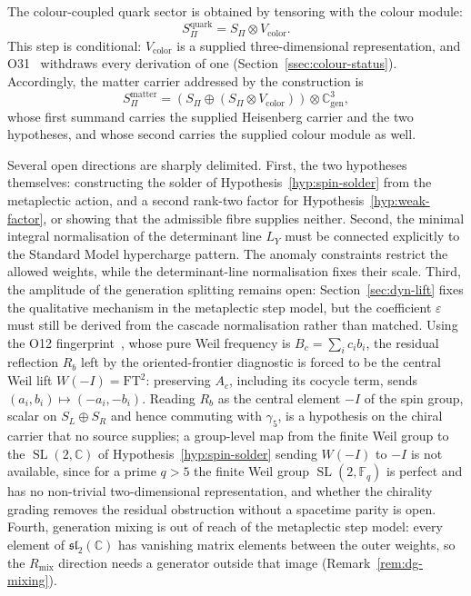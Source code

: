 \documentclass[11pt,a4paper]{article}
\theoremstyle{definition}
\theoremstyle{remark}
\newcommand{\SL}{\operatorname{SL}}
\begin{document}
  The colour-coupled quark sector is obtained by tensoring with the colour module:
  \[
    S_\Pi^{\mathrm{quark}}
    =
    S_\Pi \otimes V_{\mathrm{color}} .
  \]
  This step is conditional: $V_{\mathrm{color}}$ is a supplied three-dimensional representation,
  and O31~\cite{Beau2026a35} withdraws every derivation of one
  (Section~\ref{ssec:colour-status}).
  Accordingly, the matter carrier addressed by the construction is
  \[
    S_\Pi^{\mathrm{matter}}
    =
    \left(
      S_\Pi \oplus (S_\Pi\otimes V_{\mathrm{color}})
    \right)
    \otimes
    \mathbb{C}^3_{\mathrm{gen}},
  \]
  whose first summand carries the supplied Heisenberg carrier and the two hypotheses, and whose second
  carries the supplied colour module as well.

  Several open directions are sharply delimited.
  First, the two hypotheses themselves: constructing the solder of Hypothesis~\ref{hyp:spin-solder}
  from the metaplectic action, and a second rank-two factor for Hypothesis~\ref{hyp:weak-factor}, or
  showing that the admissible fibre supplies neither.
  Second, the minimal integral normalisation of the determinant line $L_Y$ must be
  connected explicitly to the Standard Model hypercharge pattern.
  The anomaly constraints restrict the allowed weights, while the determinant-line
  normalisation fixes their scale.
  Third, the amplitude of the generation splitting remains open: Section~\ref{sec:dyn-lift}
  fixes the qualitative mechanism in the metaplectic step model, but the coefficient $\varepsilon$ must
  still be derived from the cascade normalisation rather than matched.
  Using the O12 fingerprint~\cite{Beau2026a16}, whose pure Weil frequency is $B_c=\sum_i c_i b_i$, the
  residual reflection $R_b$ left by the oriented-frontier diagnostic is forced to be the central Weil
  lift $W(-I)=\mathrm{FT}^2$: preserving $A_c$, including its cocycle term, sends
  $(a_i,b_i)\mapsto(-a_i,-b_i)$.
  Reading $R_b$ as the central element $-I$ of the spin group, scalar on $S_L\oplus S_R$ and hence
  commuting with $\gamma_5$, is a hypothesis on the chiral carrier that no source supplies; a group-level map from
  the finite Weil group to the $\SL(2,\mathbb{C})$ of Hypothesis~\ref{hyp:spin-solder} sending $W(-I)$ to $-I$ is not
  available, since for a prime $q>5$ the finite Weil group $\SL(2,\mathbb{F}_q)$ is perfect and has no non-trivial
  two-dimensional representation, and whether the chirality grading removes the residual obstruction without a
  spacetime parity is open.
  Fourth, generation mixing is out of reach of the metaplectic step model: every element of
  $\mathfrak{sl}_2(\mathbb{C})$ has vanishing matrix elements between the outer weights, so the
  $R_{\mathrm{mix}}$ direction needs a generator outside that image (Remark~\ref{rem:dg-mixing}).
\end{document}

